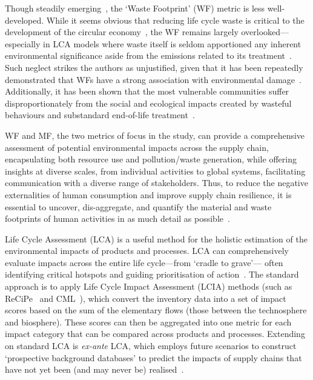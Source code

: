 \documentclass[a4paper,fleqn]{cas-dc}
\begin{document}
Though steadily
emerging~\citep{laurenti2016wastefootprint,demirer2019wastefootprint,guillotreau2023wastefootprint},
the `Waste Footprint' (WF) metric is less well-developed. While it seems
obvious that reducing life cycle waste is critical to the development of the
circular economy~\citep{towa2020wastefootprint,ellenmacarthur2015ce}, the WF
remains largely overlooked---especially in LCA models where waste itself is
seldom apportioned any inherent environmental significance aside from the
emissions related to its treatment~\citep{laurenti2023wastefootprint}. Such
neglect strikes the authors as unjustified, given that it has been repeatedly
demonstrated that WFs have a strong association with environmental
damage~\citep{laurenti2023wastefootprint,doka2024publications,
	ridoutt2010wasteimpacts,jaio2013wasteabsorbtionfootprint}. Additionally, it has
been shown that the most vulnerable communities suffer disproportionately from
the social and ecological impacts created by wasteful behaviours and
substandard end-of-life
treatment~\citep{pellow2023envjusticewaste,akese2018envjustice}.

WF and MF, the two metrics of focus in the study, can provide a comprehensive
assessment of potential environmental impacts across the supply chain,
encapsulating both resource use and pollution/waste generation, while offering
insights at diverse scales, from individual activities to global systems,
facilitating communication with a diverse range of stakeholders. Thus, to
reduce the negative externalities of human consumption and improve supply chain
resilience, it is essential to uncover, dis-aggregate, and quantify the material
and waste footprints of human activities in as much detail as
possible~\citep{bisinella2024wastelca,
	towa2020wastefootprint,berger2020mineralsinlca,sonderegger2020mineralsinlca}.

Life Cycle Assessment (LCA) is a useful method for the holistic estimation of
the environmental impacts of products and processes. LCA can comprehensively
evaluate impacts across the entire life cycle---from `cradle to grave'--- often
identifying critical hotspots and guiding prioritisation of
action~\citep{guinee2011lca}. The standard approach is to apply Life Cycle
Impact Assessment (LCIA) methods (such as ReCiPe~\citep{huijbregts2016recipe}
and CML~\citep{guinee2002cml}), which convert the inventory data into a set of
impact scores based on the sum of the elementary flows (those between the
technosphere and biosphere). These scores can then be aggregated into one
metric for each impact category that can be compared across products and
processes. Extending on standard LCA is \textit{ex-ante} LCA, which employs
future scenarios to construct `prospective background databases' to predict the
impacts of supply chains that have not yet been (and may never be)
realised~\citep{cucurachi2018exante,blanco2020exante}.
\end{document}
